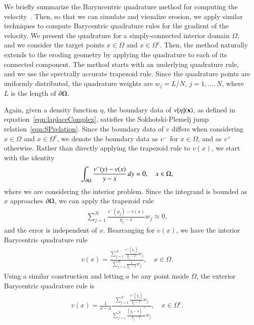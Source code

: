 \documentclass[preprint, 10pt]{elsarticle}
\begin{document}
We briefly summarize the Baryncentric quadrature method for computing
the velocity~\cite{bar-wu-vee2015}.  Then, so that we can simulate and
visualize erosion, we apply similar techniques to compute Barycentric
quadrature rules for the gradient of the velocity.  We present the
quadrature for a simply-connected interior domain $\Omega$, and we
consider the target points $x \in \Omega$ and $x \in \Omega^c$. Then,
the method naturally extends to the eroding geometry by applying the
quadrature to each of its connected component.  The method starts with
an underlying quadrature rule, and we use the spectrally accurate
trapezoid rule.  Since the quadrature points are uniformly distributed,
the quadrature weights are $w_j = L/N$, $j=1,\ldots,N$, where $L$ is the
length of ${\partial}\Omega$.

Again, given a density function $\eta$, the boundary data of
$v[\eta]({\mathbf{x}})$, as defined in equation~\eqref{eqn:laplaceComplex},
satisfies the Sokhotski-Plemelj jump relation~\eqref{eqn:SPrelation}.
Since the boundary data of $v$ differs when considering $x \in \Omega$
and $x \in \Omega^c$, we denote the boundary data as $v^-$ for $x \in
\Omega$, and as $v^+$ otherwise.  Rather than directly applying the
trapezoid rule to $v(x)$, we start with the identity
\begin{align}
  \int_{{\partial}\Omega} \frac{v^{-}(y) - v(x)}{y - x} \,dy = 0,
    \quad x \in \Omega,
\end{align}
where we are considering the interior problem.  Since the integrand is
bounded as $x$ approaches ${\partial}\Omega$, we can apply the trapezoid rule
\begin{align}
  \sum_{j=1}^{N} \frac{v^{-}(y_j) - v(x)}{y_j - x} w_j \approx 0,
\end{align}
and the error is independent of $x$.  Rearranging for $v(x)$, we have
the interior Barycentric quadrature rule
\begin{align}
  v(x) = \frac{\sum\limits_{j=1}^N \frac{v^{-}(y_j)}{y_j - x} w_j}
  {\sum\limits_{j=1}^N \frac{1}{y_j - x} w_j}, \quad x \in \Omega.
  \label{eqn:BaryvInterior}
\end{align}
Using a similar construction and letting $a$ be any point inside
$\Omega$, the exterior Barycentric quadrature rule is
\begin{align}
  v(x) = \frac{1}{x-a} 
    \frac{\sum\limits_{j=1}^N \frac{v^+(y_j)}{y_j - x}w_j}
    {\sum\limits_{j=1}^N \frac{(y_j - a)^{-1}}{y_j - x}w_j},
    \quad x \in \Omega^c.
  \label{eqn:BaryvExterior}
\end{align}
\end{document}
